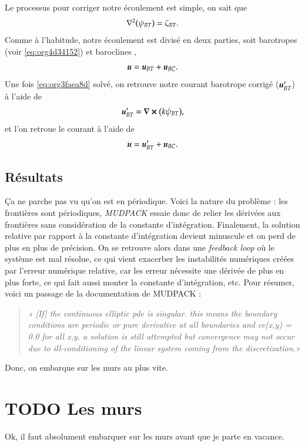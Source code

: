 \documentclass[10pt]{article}
\numberwithin{equation}{section}
\newcommand{\uu}{\vb*{u}}
\begin{document}
Le processus pour corriger notre écoulement est simple, on sait que
\begin{equation}
\label{eq:org3faea8d}
   \laplacian(\psi_{BT}) = \zeta_{BT}.
\end{equation}
Comme à l'habitude, notre écoulement est divisé en deux parties, soit barotropes (voir \ref{eq:org4d34152}) et baroclines ,
\begin{equation}
   \uu = \uu_{BT} + \uu_{BC}.
\end{equation}
Une fois \ref{eq:org3faea8d} solvé, on retrouve notre courant barotrope corrigé (\(\uu_{BT}'\)) à l'aide de
\begin{equation}
   \uu_{BT}' = \curl(k\psi_{BT}),
\end{equation}
et l'on retroue le courant à l'aide de
\begin{equation}
   \uu = \uu_{BT}' + \uu_{BC}.
\end{equation}


\subsection{Résultats}
\label{sec:orga0f099e}
Ça ne parche pas vu qu'on est en périodique.
Voici la nature du problème : les frontières sont périodiques, \emph{MUDPACK} essaie donc de relier les dérivées aux frontières sans considération de la constante d'intégration.
Finalement, la solution relative par rapport à la constante d'intégration devient minuscule et on perd de plus en plus de précision.
On se retrouve alors dans une \emph{feedback loop} où le système est mal résolue, ce qui vient exacerber les instabilités numériques créées par l'erreur numérique relative, car les erreur nécessite une dérivée de plus en plus forte, ce qui fait aussi monter la constante d'intégration, etc.
Pour résumer, voici un passage de la documentation de MUDPACK :\bigskip

\begin{quote}
\emph{« [If] the continuous elliptic pde is singular.  this means the boundary conditions are periodic or pure derivative at all boundaries and ce(x,y) = 0.0 for all x,y.  a solution is still attempted but convergence may not occur due to ill-conditioning of the linear system coming from the discretization.»}
\end{quote}

Donc, on embarque sur les murs au plus vite.

\section{{\bfseries\sffamily TODO} Les murs}
\label{sec:org00ca8c6}
Ok, il faut absolument embarquer sur les murs avant que je parte en vacance.
\end{document}
